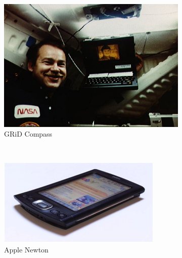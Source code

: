 \begin{figure}[htb]
        \centering
        \begin{subfigure}[b]{0.3\textwidth}
                \includegraphics[width=\textwidth]{images/grid-compass}
                \caption{GRiD Compass}
                \label{fig:grid-compass}
        \end{subfigure}%
        ~ %
        \begin{subfigure}[b]{0.3\textwidth}
                \includegraphics[width=\textwidth]{images/apple-newton}
                \caption{Apple Newton}
                \label{fig:apple-newton}
        \end{subfigure}
        ~ %
        \begin{subfigure}[b]{0.3\textwidth}

\end{subfigure}
\end{figure}
